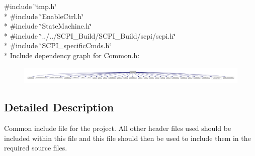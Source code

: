 {\ttfamily \#include \char`\"{}tmp.\-h\char`\"{}}\\*
{\ttfamily \#include \char`\"{}Enable\-Ctrl.\-h\char`\"{}}\\*
{\ttfamily \#include \char`\"{}State\-Machine.\-h\char`\"{}}\\*
{\ttfamily \#include \char`\"{}../../\-S\-C\-P\-I\-\_\-\-Build/\-S\-C\-P\-I\-\_\-\-Build/scpi/scpi.\-h\char`\"{}}\\*
{\ttfamily \#include \char`\"{}S\-C\-P\-I\-\_\-specific\-Cmds.\-h\char`\"{}}\\*
Include dependency graph for Common.\-h\-:\nopagebreak
\begin{figure}[H]
\begin{center}
\leavevmode
\includegraphics[width=350pt]{a00062}
\end{center}
\end{figure}


\subsection{Detailed Description}
Common include file for the project. All other header files used should be included within this file and this file should then be used to include them in the required source files. 